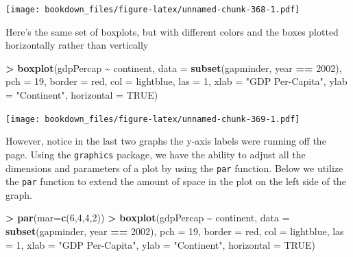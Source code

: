 \documentclass[
]{krantz}
\makeatletter
\newenvironment{Shaded}{\begin{snugshade}}{\end{snugshade}}
\newcommand{\DataTypeTok}[1]{\textcolor[rgb]{0.27,0.27,0.27}{#1}}
\newcommand{\DecValTok}[1]{\textcolor[rgb]{0.06,0.06,0.06}{#1}}
\newcommand{\KeywordTok}[1]{\textcolor[rgb]{0.27,0.27,0.27}{\textbf{#1}}}
\newcommand{\NormalTok}[1]{#1}
\newcommand{\OperatorTok}[1]{\textcolor[rgb]{0.43,0.43,0.43}{\textbf{#1}}}
\newcommand{\OtherTok}[1]{\textcolor[rgb]{0.37,0.37,0.37}{#1}}
\newcommand{\StringTok}[1]{\textcolor[rgb]{0.5,0.5,0.5}{#1}}
\newenvironment{kframe}{%
\medskip{}
\setlength{\fboxsep}{.8em}
 \def\at@end@of@kframe{}%
 \ifinner\ifhmode%
  \def\at@end@of@kframe{\end{minipage}}%
  \begin{minipage}{\columnwidth}%
 \fi\fi%
 \def\FrameCommand##1{\hskip\@totalleftmargin \hskip-\fboxsep
 \colorbox{shadecolor}{##1}\hskip-\fboxsep
     \hskip-\linewidth \hskip-\@totalleftmargin \hskip\columnwidth}%
 \MakeFramed {\advance\hsize-\width
   \@totalleftmargin\z@ \linewidth\hsize
   \@setminipage}}%
 {\par\unskip\endMakeFramed%
 \at@end@of@kframe}
\renewenvironment{Shaded}{\begin{kframe}}{\end{kframe}}
\makeatother
\begin{document}
\texttt{[image: bookdown\_files/figure-latex/unnamed-chunk-368-1.pdf]}

Here's the same set of boxplots, but with different colors and the boxes plotted horizontally rather than vertically

\begin{Shaded}
\begin{Highlighting}[]
\OperatorTok{\textgreater{}}\StringTok{ }\KeywordTok{boxplot}\NormalTok{(gdpPercap }\OperatorTok{\textasciitilde{}}\StringTok{ }\NormalTok{continent, }\DataTypeTok{data =} \KeywordTok{subset}\NormalTok{(gapminder, year }\OperatorTok{==}\StringTok{ }\DecValTok{2002}\NormalTok{), }\DataTypeTok{pch =} \DecValTok{19}\NormalTok{, }\DataTypeTok{border =} \StringTok{\textquotesingle{}red\textquotesingle{}}\NormalTok{, }\DataTypeTok{col =} \StringTok{\textquotesingle{}lightblue\textquotesingle{}}\NormalTok{, }\DataTypeTok{las =} \DecValTok{1}\NormalTok{, }\DataTypeTok{xlab =} \StringTok{"GDP Per{-}Capita"}\NormalTok{, }\DataTypeTok{ylab =} \StringTok{"Continent"}\NormalTok{, }\DataTypeTok{horizontal =} \OtherTok{TRUE}\NormalTok{)}
\end{Highlighting}
\end{Shaded}

\texttt{[image: bookdown\_files/figure-latex/unnamed-chunk-369-1.pdf]}

However, notice in the last two graphs the y-axis labels were running off the page. Using the \texttt{graphics} package, we have the ability to adjust all the dimensions and parameters of a plot by using the \texttt{par} function. Below we utilize the \texttt{par} function to extend the amount of space in the plot on the left side of the graph.

\begin{Shaded}
\begin{Highlighting}[]
\OperatorTok{\textgreater{}}\StringTok{ }\KeywordTok{par}\NormalTok{(}\DataTypeTok{mar=}\KeywordTok{c}\NormalTok{(}\DecValTok{6}\NormalTok{,}\DecValTok{4}\NormalTok{,}\DecValTok{4}\NormalTok{,}\DecValTok{2}\NormalTok{))}
\OperatorTok{\textgreater{}}\StringTok{ }\KeywordTok{boxplot}\NormalTok{(gdpPercap }\OperatorTok{\textasciitilde{}}\StringTok{ }\NormalTok{continent, }\DataTypeTok{data =} \KeywordTok{subset}\NormalTok{(gapminder, year }\OperatorTok{==}\StringTok{ }\DecValTok{2002}\NormalTok{), }\DataTypeTok{pch =} \DecValTok{19}\NormalTok{, }\DataTypeTok{border =} \StringTok{\textquotesingle{}red\textquotesingle{}}\NormalTok{, }\DataTypeTok{col =} \StringTok{\textquotesingle{}lightblue\textquotesingle{}}\NormalTok{, }\DataTypeTok{las =} \DecValTok{1}\NormalTok{, }\DataTypeTok{xlab =} \StringTok{"GDP Per{-}Capita"}\NormalTok{, }\DataTypeTok{ylab =} \StringTok{"Continent"}\NormalTok{, }\DataTypeTok{horizontal =} \OtherTok{TRUE}\NormalTok{)}
\end{Highlighting}
\end{Shaded}
\end{document}
